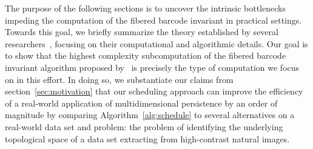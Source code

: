 \documentclass{siamart190516}
\begin{document}
The purpose of the following sections is to uncover the intrinsic bottlenecks impeding the computation of the fibered barcode invariant in practical settings. Towards this goal, we briefly summarize the theory established by several researchers~\cite{lesnick2015interactive, carlsson2010computing, landi2014rank}, focusing on their computational and algorithmic details. 
Our goal is to show that the highest complexity subcomputation of the fibered barcode invariant algorithm proposed by~\cite{lesnick2015interactive} is precisely the type of computation we focus on in this effort. 
In doing so, we substantiate our claims from section~\ref{sec:motivation} that our scheduling approach can improve the efficiency of a real-world application of multidimensional persistence by an order of magnitude by comparing Algorithm~\ref{alg:schedule} to several alternatives on a real-world data set and problem: the problem of identifying the underlying topological space of a data set extracting from high-contrast natural images. 

\end{document}
